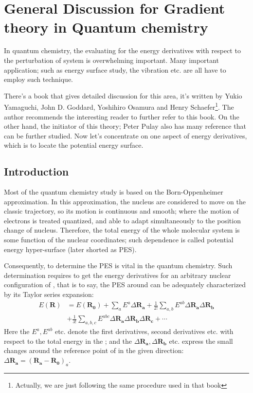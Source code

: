 
\chapter{General Discussion for Gradient theory in Quantum chemistry}
%
%
%
In quantum chemistry, the evaluating for the energy derivatives with
respect to the perturbation of system is overwhelming important. Many
important application; such as energy surface study, the vibration etc. are all
have to employ such technique.

There's a book that gives detailed discussion for this area, it's written by 
Yukio Yamaguchi, John D. Goddard, Yoshihiro Osamura and Henry
Schaefer\cite{New_Dimension_for_Derivatives_Calculation}\footnote{Actually,
we are just following the same procedure used in that book}.  The author
recommends the interesting reader to further refer to this book. On the other
hand, the initiator of this theory; Peter Pulay also has many
reference\cite{Pulay1, Pulay2, Pulay3, Pulay4, Pulay5, Pulay6, pulay:5043} that
can be further studied. Now let's concentrate on one aspect of energy
derivatives, which is to locate the potential energy surface.


\section{Introduction}
%
%
%
Most of the quantum chemistry study is based on the Born-Oppenheimer
approximation. In this approximation, the nucleus are considered to
move on the classic trajectory, so its motion is continuous and
smooth; where the motion of electrons is treated quantized, and able
to adapt simultaneously to the position change of nucleus.  Therefore,
the total energy of the whole molecular system is some function of the
nuclear coordinates; such dependence is called potential energy
hyper-surface (later shorted as PES).

Consequently, to determine the PES is vital in the quantum
chemistry. Such determination requires to get the energy derivatives
for an arbitrary nuclear configuration of , that is to
say, the PES around  can be adequately characterized by
its Taylor series expansion:
\begin{equation}\label{PULAYeq:1}
  \begin{split}
    E(\mathbf{R}) &= E(\mathbf{R_{0}}) +
    \sum_{a}E^{a}\Delta\mathbf{R_{a}}
    +  \frac{1}{2!}\sum_{a,b}E^{ab}\Delta\mathbf{R_{a}}\Delta\mathbf{R_{b}} \\
    & +
    \frac{1}{3!}\sum_{a,b,c}E^{abc}\Delta\mathbf{R_{a}}\Delta\mathbf{R_{b}}
    \Delta\mathbf{R_{c}} + \cdots
  \end{split}
\end{equation}
Here the $E^{a}, E^{ab}$ etc. denote the first derivatives, second
derivatives etc. with respect to the total energy in the ;
and the $\Delta\mathbf{R_{a}}, \Delta\mathbf{R_{b}}$ etc. express the
small changes around the reference point of  in the given
direction: $\Delta\mathbf{R_{a}} =
(\mathbf{R_{a}}-\mathbf{R_{0}})_{a}$.

